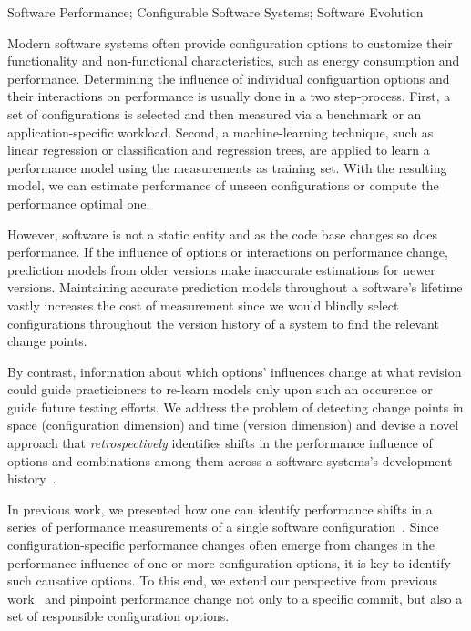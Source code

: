 \documentclass[utf8,biblatex]{lni}
\begin{document}
\begin{keywords}
Software Performance; Configurable Software Systems; Software Evolution
\end{keywords}

Modern software systems often provide configuration options to customize their functionality and non-functional characteristics, such as energy consumption and performance. 
Determining the influence of individual configuartion options and their interactions on performance is usually done in a two step-process. First, a set of configurations is selected and then measured via a benchmark or an application-specific workload. Second, a machine-learning technique, such as linear regression or classification and regression trees, are applied to learn a performance model using the measurements as training set. With the resulting model, we can estimate performance of unseen configurations or compute the performance optimal one.

However, software is not a static entity and as the code base changes so does performance. If the influence of options or interactions on performance change, prediction models from older versions make inaccurate estimations for newer versions. Maintaining accurate prediction models throughout a software's lifetime vastly increases the cost of measurement since we would blindly select configurations throughout the version history of a system to find the relevant change points.

By contrast, information about which options' influences change at what revision could guide practicioners to re-learn models only upon such an occurence or guide future testing efforts. 
We address the problem of detecting change points in space (configuration dimension) and time (version dimension) and devise a novel approach that \textit{retrospectively} identifies shifts in the performance influence of options and combinations among them across a software systems’s development history~\cite{muehlbauer_identifying_2020}. 

In previous work, we presented how one can identify performance shifts in a series of performance measurements of a single software configuration~\cite{muhlbauer_accurate_2019}.
Since configuration-specific performance changes often emerge from changes in the performance influence of one or more configuration options, it is key to identify such causative options. To this end, we extend our perspective from previous work~\cite{muhlbauer_accurate_2019} and pinpoint performance change not only to a specific commit, but also a set of responsible configuration options. 
\end{document}
